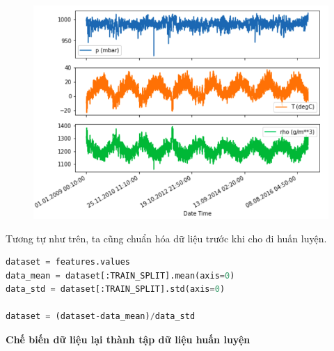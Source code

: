 \vspace{-0.75cm}
\begin{center}
	\begin{figure}[htp]
		\begin{center}
			\includegraphics[scale=0.6]{./images/7.png}
		\end{center}
	\end{figure}
\end{center}


Tương tự như trên, ta cũng chuẩn hóa dữ liệu trước khi cho đi huấn luyện.



\begin{lstlisting}[language=Python]
dataset = features.values
data_mean = dataset[:TRAIN_SPLIT].mean(axis=0)
data_std = dataset[:TRAIN_SPLIT].std(axis=0)

dataset = (dataset-data_mean)/data_std
\end{lstlisting}




\vspace{0.25cm}
\changefontsizes{13pt}
\setlength{\parindent}{0cm}
\textbf{Chế biến dữ liệu lại thành tập dữ liệu huấn luyện}

